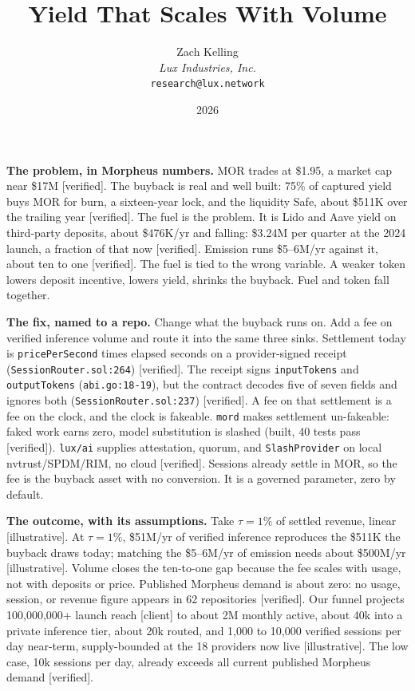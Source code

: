 \documentclass[11pt,a4paper]{article}
\title{Yield That Scales With Volume}
\author{Zach Kelling\\\textit{Lux Industries, Inc.}\\\texttt{research@lux.network}}
\date{2026}
\newcommand{\code}[1]{\texttt{\small #1}}
\begin{document}
\luxcoverpage
\sloppy


\noindent\textbf{The problem, in Morpheus numbers.}
MOR trades at \$1.95, a market cap near \$17M [verified]. The buyback is real and well built:
75\% of captured yield buys MOR for burn, a sixteen-year lock, and the liquidity Safe, about
\$511K over the trailing year [verified]. The fuel is the problem. It is Lido and Aave yield on
third-party deposits, about \$476K/yr and falling: \$3.24M per quarter at the 2024 launch, a
fraction of that now [verified]. Emission runs \$5--6M/yr against it, about ten to one
[verified]. The fuel is tied to the wrong variable. A weaker token lowers deposit incentive,
lowers yield, shrinks the buyback. Fuel and token fall together.

\noindent\textbf{The fix, named to a repo.}
Change what the buyback runs on. Add a fee on verified inference volume and route it into the
same three sinks. Settlement today is \code{pricePerSecond} times elapsed seconds on a
provider-signed receipt (\code{SessionRouter.sol:264}) [verified]. The receipt signs
\code{inputTokens} and \code{outputTokens} (\code{abi.go:18-19}), but the contract decodes five
of seven fields and ignores both (\code{SessionRouter.sol:237}) [verified]. A fee on that
settlement is a fee on the clock, and the clock is fakeable. \code{mord} makes settlement
un-fakeable: faked work earns zero, model substitution is slashed (built, 40 tests pass
[verified]). \code{lux/ai} supplies attestation, quorum, and \code{SlashProvider} on local
nvtrust/SPDM/RIM, no cloud [verified]. Sessions already settle in MOR, so the fee is the
buyback asset with no conversion. It is a governed parameter, zero by default.

\noindent\textbf{The outcome, with its assumptions.}
Take $\tau = 1\%$ of settled revenue, linear [illustrative]. At $\tau = 1\%$, \$51M/yr of
verified inference reproduces the \$511K the buyback draws today; matching the \$5--6M/yr of
emission needs about \$500M/yr [illustrative]. Volume closes the ten-to-one gap because the fee
scales with usage, not with deposits or price. Published Morpheus demand is about zero: no
usage, session, or revenue figure appears in 62 repositories [verified]. Our funnel projects
100,000,000+ launch reach [client] to about 2M monthly active, about 40k into a private
inference tier, about 20k routed, and 1,000 to 10,000 verified sessions per day near-term,
supply-bounded at the 18 providers now live [illustrative]. The low case, 10k sessions per day,
already exceeds all current published Morpheus demand [verified].
\end{document}
